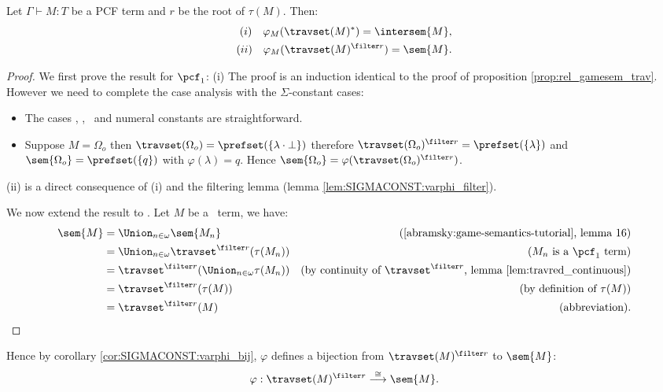 \begin{proposition}
Let $\Gamma \vdash M : T$ be a PCF term and $r$ be the root of
$\tau(M)$. Then:
\begin{align*}
(i)  \quad\varphi_M(\travset(M)^*) = \intersem{M},  \\
(ii) \quad \varphi_M(\travset(M)^{\filter r}) = \sem{M}.
\end{align*}
\end{proposition}
\begin{proof}
We first prove the result for $\pcf_1$: (i) The proof is an
induction identical to the proof of proposition
\ref{prop:rel_gamesem_trav}. However we need to complete the case
analysis with the $\Sigma$-constant cases:
\begin{itemize}
\item The cases \pcfsucc, \pcfpred, \pcfcond\ and numeral constants are straightforward.

\item Suppose $M = \Omega_o$ then $\travset(\Omega_o) = \prefset ( \{ \lambda \cdot \bot \} )$ therefore
$\travset(\Omega_o)^{\filter r} = \prefset( \{ \lambda \} )$
and $\sem{\Omega_o} = \prefset( \{ q \})$ with $\varphi(\lambda) =
q$. Hence $\sem{\Omega_o} = \varphi
(\travset(\Omega_o)^{\filter r})$.
\end{itemize}
(ii) is a direct consequence of (i) and the filtering lemma (lemma
\ref{lem:SIGMACONST:varphi_filter}). \vspace{10pt}

\noindent We now extend the result to \pcf. Let $M$ be a \pcf\ term,
we have:
\begin{align*}
\sem{M} &= \Union_{n\in\omega} \sem{M_n} & (\mbox{\cite{abramsky:game-semantics-tutorial}, lemma 16})\\
&= \Union_{n\in\omega} \travset^{\filter r}(\tau(M_n)) & (M_n \mbox{ is a $\pcf_1$ term}) \\
&= \travset^{\filter r}(\Union_{n\in\omega} \tau(M_n) ) & (\mbox{by continuity of $\travset^{\filter r}$, lemma \ref{lem:travred_continuous}}) \\
&= \travset^{\filter r}(\tau(M)) & (\mbox{by definition of } \tau(M)) \\
&= \travset^{\filter r}(M) & (\mbox{abbreviation}).
\end{align*}
\end{proof}

Hence by corollary \ref{cor:SIGMACONST:varphi_bij}, $\varphi$
defines a bijection from $\travset(M)^{\filter r}$ to
$\sem{M}$:
$$\varphi : \travset(M)^{\filter r} \stackrel{\cong}{\longrightarrow} \sem{M}.$$

